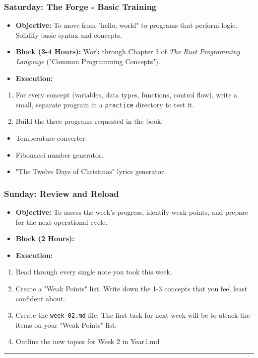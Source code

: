 \documentclass[11pt,a4paper]{report}
\begin{document}
\subsubsection{\textbf{Saturday: The Forge - Basic Training}}
\begin{itemize}
  \item \textbf{Objective:} To move from "hello, world" to programs that perform logic. Solidify basic syntax and concepts.
  \item \textbf{Block (3-4 Hours):} Work through Chapter 3 of \textit{The Rust Programming Language} ("Common Programming Concepts").
  \item \textbf{Execution:}
\end{itemize}
\begin{enumerate}
  \item For every concept (variables, data types, functions, control flow), write a small, separate program in a \texttt{practice} directory to test it.
  \item Build the three programs requested in the book:
\end{enumerate}
\begin{itemize}
  \item Temperature converter.
  \item Fibonacci number generator.
  \item "The Twelve Days of Christmas" lyrics generator.

\end{itemize}
\subsubsection{\textbf{Sunday: Review and Reload}}
\begin{itemize}
  \item \textbf{Objective:} To assess the week's progress, identify weak points, and prepare for the next operational cycle.
  \item \textbf{Block (2 Hours):}
  \item \textbf{Execution:}
\end{itemize}
\begin{enumerate}
  \item Read through every single note you took this week.
  \item Create a "Weak Points" list. Write down the 1-3 concepts that you feel least confident about.
  \item Create the \texttt{week\_02.md} file. The first task for next week will be to attack the items on your "Weak Points" list.
  \item Outline the new topics for Week 2 in Year1.md

\end{enumerate}
\noindent\rule{\textwidth}{0.4pt}
\end{document}
